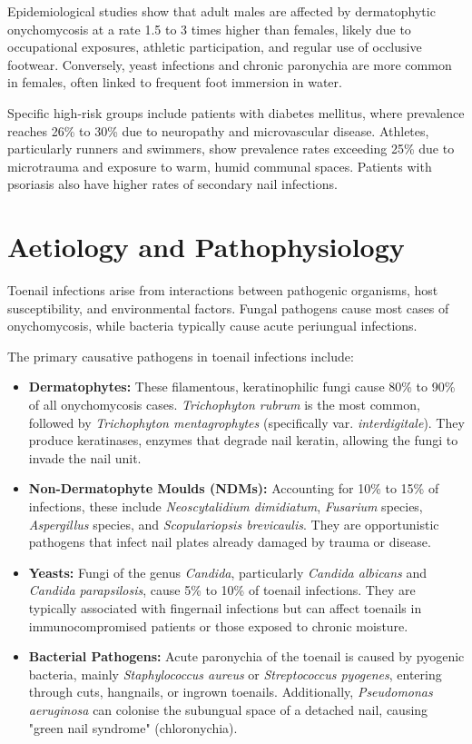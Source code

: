 Epidemiological studies show that adult males are affected by dermatophytic onychomycosis at a rate 1.5 to 3 times higher than females, likely due to occupational exposures, athletic participation, and regular use of occlusive footwear. Conversely, yeast infections and chronic paronychia are more common in females, often linked to frequent foot immersion in water.

Specific high-risk groups include patients with diabetes mellitus, where prevalence reaches 26\% to 30\% due to neuropathy and microvascular disease. Athletes, particularly runners and swimmers, show prevalence rates exceeding 25\% due to microtrauma and exposure to warm, humid communal spaces. Patients with psoriasis also have higher rates of secondary nail infections.

\section*{Aetiology and Pathophysiology}
Toenail infections arise from interactions between pathogenic organisms, host susceptibility, and environmental factors. Fungal pathogens cause most cases of onychomycosis, while bacteria typically cause acute periungual infections.

The primary causative pathogens in toenail infections include:
\begin{itemize}
    \item \textbf{Dermatophytes:} These filamentous, keratinophilic fungi cause 80\% to 90\% of all onychomycosis cases. \emph{Trichophyton rubrum} is the most common, followed by \emph{Trichophyton mentagrophytes} (specifically var. \emph{interdigitale}). They produce keratinases, enzymes that degrade nail keratin, allowing the fungi to invade the nail unit.
    \item \textbf{Non-Dermatophyte Moulds (NDMs):} Accounting for 10\% to 15\% of infections, these include \emph{Neoscytalidium dimidiatum}, \emph{Fusarium} species, \emph{Aspergillus} species, and \emph{Scopulariopsis brevicaulis}. They are opportunistic pathogens that infect nail plates already damaged by trauma or disease.
    \item \textbf{Yeasts:} Fungi of the genus \emph{Candida}, particularly \emph{Candida albicans} and \emph{Candida parapsilosis}, cause 5\% to 10\% of toenail infections. They are typically associated with fingernail infections but can affect toenails in immunocompromised patients or those exposed to chronic moisture.
    \item \textbf{Bacterial Pathogens:} Acute paronychia of the toenail is caused by pyogenic bacteria, mainly \emph{Staphylococcus aureus} or \emph{Streptococcus pyogenes}, entering through cuts, hangnails, or ingrown toenails. Additionally, \emph{Pseudomonas aeruginosa} can colonise the subungual space of a detached nail, causing "green nail syndrome" (chloronychia).
\end{itemize}

